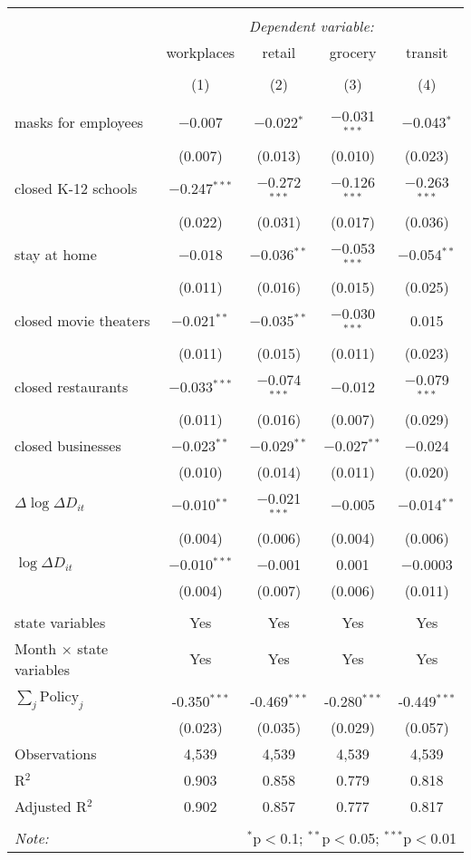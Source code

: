 \begin{tabular}{@{\extracolsep{1pt}}lcccc} 
\\[-1.8ex]\hline 
\hline \\[-1.8ex] 
 & \multicolumn{4}{c}{\textit{Dependent variable:}} \\ 
\cline{2-5} 
 & workplaces & retail & grocery & transit \\ 
\\[-1.8ex] & (1) & (2) & (3) & (4)\\ 
\hline \\[-1.8ex] 
 masks for employees & $-$0.007 & $-$0.022$^{*}$ & $-$0.031$^{***}$ & $-$0.043$^{*}$ \\ 
  & (0.007) & (0.013) & (0.010) & (0.023) \\ 
  closed K-12 schools & $-$0.247$^{***}$ & $-$0.272$^{***}$ & $-$0.126$^{***}$ & $-$0.263$^{***}$ \\ 
  & (0.022) & (0.031) & (0.017) & (0.036) \\ 
  stay at home & $-$0.018 & $-$0.036$^{**}$ & $-$0.053$^{***}$ & $-$0.054$^{**}$ \\ 
  & (0.011) & (0.016) & (0.015) & (0.025) \\ 
  closed movie theaters & $-$0.021$^{**}$ & $-$0.035$^{**}$ & $-$0.030$^{***}$ & 0.015 \\ 
  & (0.011) & (0.015) & (0.011) & (0.023) \\ 
  closed restaurants & $-$0.033$^{***}$ & $-$0.074$^{***}$ & $-$0.012 & $-$0.079$^{***}$ \\ 
  & (0.011) & (0.016) & (0.007) & (0.029) \\ 
  closed businesses & $-$0.023$^{**}$ & $-$0.029$^{**}$ & $-$0.027$^{**}$ & $-$0.024 \\ 
  & (0.010) & (0.014) & (0.011) & (0.020) \\ 
  $\Delta \log \Delta D_{it}$ & $-$0.010$^{**}$ & $-$0.021$^{***}$ & $-$0.005 & $-$0.014$^{**}$ \\ 
  & (0.004) & (0.006) & (0.004) & (0.006) \\ 
  $\log \Delta D_{it}$ & $-$0.010$^{***}$ & $-$0.001 & 0.001 & $-$0.0003 \\ 
  & (0.004) & (0.007) & (0.006) & (0.011) \\ 
 \hline \\[-1.8ex] 
state variables & Yes & Yes & Yes & Yes \\ 
Month $\times$ state variables & Yes & Yes & Yes & Yes \\ 
\hline \\[-1.8ex] 
$\sum_j \mathrm{Policy}_j$ & -0.350$^{***}$ & -0.469$^{***}$ & -0.280$^{***}$ & -0.449$^{***}$ \\ 
 & (0.023) & (0.035) & (0.029) & (0.057) \\ 
Observations & 4,539 & 4,539 & 4,539 & 4,539 \\ 
R$^{2}$ & 0.903 & 0.858 & 0.779 & 0.818 \\ 
Adjusted R$^{2}$ & 0.902 & 0.857 & 0.777 & 0.817 \\ 
\hline 
\hline \\[-1.8ex] 
\textit{Note:}  & \multicolumn{4}{r}{$^{*}$p$<$0.1; $^{**}$p$<$0.05; $^{***}$p$<$0.01} \\ 
\end{tabular} 